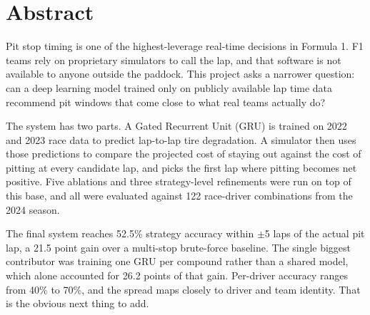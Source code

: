 \section*{Abstract}

Pit stop timing is one of the highest-leverage real-time decisions in Formula 1. F1 teams rely on proprietary simulators to call the lap, and that software is not available to anyone outside the paddock. This project asks a narrower question: can a deep learning model trained only on publicly available lap time data recommend pit windows that come close to what real teams actually do?

The system has two parts. A Gated Recurrent Unit (GRU) is trained on 2022 and 2023 race data to predict lap-to-lap tire degradation. A simulator then uses those predictions to compare the projected cost of staying out against the cost of pitting at every candidate lap, and picks the first lap where pitting becomes net positive. Five ablations and three strategy-level refinements were run on top of this base, and all were evaluated against 122 race-driver combinations from the 2024 season.

The final system reaches 52.5\% strategy accuracy within $\pm$5 laps of the actual pit lap, a 21.5 point gain over a multi-stop brute-force baseline. The single biggest contributor was training one GRU per compound rather than a shared model, which alone accounted for 26.2 points of that gain. Per-driver accuracy ranges from 40\% to 70\%, and the spread maps closely to driver and team identity. That is the obvious next thing to add.


